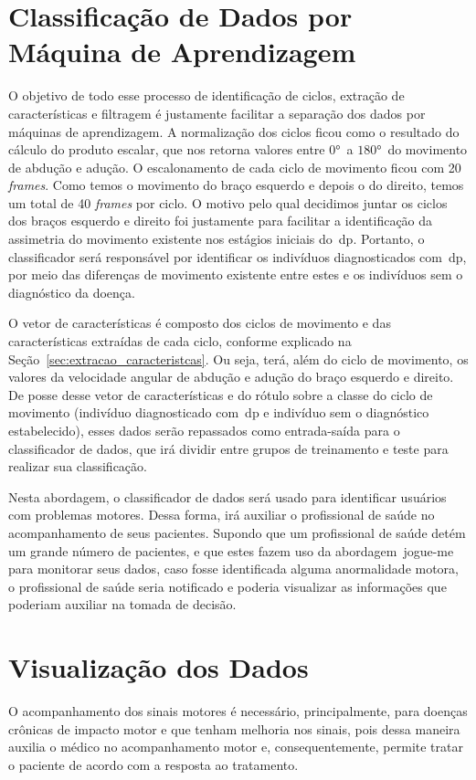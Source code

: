 \section{Classificação de Dados por Máquina de Aprendizagem}\label{section:class_dados}
O objetivo de todo esse processo de identificação de ciclos, extração de características e filtragem é justamente facilitar a separação dos dados por máquinas de aprendizagem. A normalização dos ciclos ficou como o resultado do cálculo do produto escalar, que nos retorna valores entre $ 0° $\ a $ 180° $\, do movimento de abdução e adução. O escalonamento de cada ciclo de movimento ficou com 20 \textit{frames}. Como temos o movimento do braço esquerdo e depois o do direito, temos um total de 40 \textit{frames} por ciclo. O motivo pelo qual decidimos juntar os ciclos dos braços esquerdo e direito foi justamente para facilitar a identificação da assimetria do movimento existente nos estágios iniciais do~\ac{dp}. Portanto, o classificador será responsável por identificar os indivíduos diagnosticados com~\ac{dp}, por meio das diferenças de movimento existente entre estes e os indivíduos sem o diagnóstico da doença. 

O vetor de características é composto dos ciclos de movimento e das características extraídas de cada ciclo, conforme explicado na Seção~\ref{sec:extracao_caracteristcas}. Ou seja, terá, além do ciclo de movimento, os valores da velocidade angular de abdução e adução do braço esquerdo e direito. De posse desse vetor de características e do rótulo sobre a classe do ciclo de movimento (indivíduo diagnosticado com~\ac{dp} e indivíduo sem o diagnóstico estabelecido), esses dados serão repassados como entrada-saída para o classificador de dados, que irá dividir entre grupos de treinamento e teste para realizar sua classificação.

Nesta abordagem, o classificador de dados será usado para identificar usuários com problemas motores. Dessa forma, irá auxiliar o profissional de saúde no acompanhamento de seus pacientes. Supondo que um profissional de saúde detém um grande número de pacientes, e que estes fazem uso da abordagem~\ac{jogue-me} para monitorar seus dados, caso fosse identificada alguma anormalidade motora, o profissional de saúde seria notificado e poderia visualizar as informações que poderiam auxiliar na tomada de decisão.





\section{Visualização dos Dados}
O acompanhamento dos sinais motores é necessário, principalmente, para doenças crônicas de impacto motor e que tenham melhoria nos sinais, pois dessa maneira auxilia o médico no acompanhamento motor e, consequentemente, permite tratar o paciente de acordo com a resposta ao tratamento.

